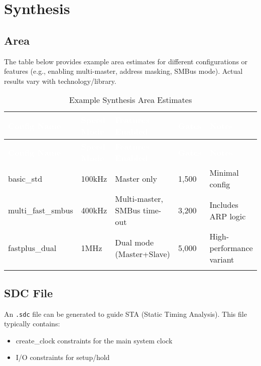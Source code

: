 \section{Synthesis}

\subsection{Area}
The table below provides example area estimates for different configurations or features (e.g., enabling multi-master, address masking, SMBus mode). Actual results vary with technology/library.

\renewcommand*{\arraystretch}{1.4}
\begingroup
\small
\begin{longtable}[H]{
    | p{}
    | p{}
    | p{}
    | p{}
    | p{} |
  }
  \hline
  \rowcolor{black}
  \textcolor{white}{\textbf{Config Name}} &
  \textcolor{white}{\textbf{Speed Mode}} &
  \textcolor{white}{\textbf{Features Enabled}} &
  \textcolor{white}{\textbf{Gates}} &
  \textcolor{white}{\textbf{Notes}} \\ 
  \hline \hline
  \endfirsthead

  \rowcolor{black}
  \textcolor{white}{\textbf{Config Name}} &
  \textcolor{white}{\textbf{Speed Mode}} &
  \textcolor{white}{\textbf{Features Enabled}} &
  \textcolor{white}{\textbf{Gates}} &
  \textcolor{white}{\textbf{Notes}} \\ 
  \hline \hline
  \endhead

  \hline
  \endfoot

basic\_std &
100kHz &
Master only &
1,500 &
Minimal config \\ \hline

multi\_fast\_smbus &
400kHz &
Multi-master, SMBus time-out &
3,200 &
Includes ARP logic \\ \hline

fastplus\_dual &
1MHz &
Dual mode (Master+Slave) &
5,000 &
High-performance variant \\ \hline

\caption{Example Synthesis Area Estimates}
\label{table:area}
\end{longtable}
\endgroup

\subsection{SDC File}
An \texttt{.sdc} file can be generated to guide STA (Static Timing Analysis). This file typically contains:
\begin{itemize}
    \item create\_clock constraints for the main system clock
    \item I/O constraints for setup/hold
\end{itemize}

